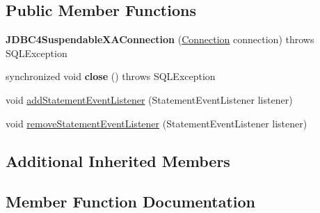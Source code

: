 \subsection*{Public Member Functions}
\begin{DoxyCompactItemize}
\item 
\mbox{\label{classcom_1_1mysql_1_1jdbc_1_1jdbc2_1_1optional_1_1_j_d_b_c4_suspendable_x_a_connection_a0c2994bc20054bb0adfce57478b081b2}} 
{\bfseries J\+D\+B\+C4\+Suspendable\+X\+A\+Connection} (\mbox{\hyperlink{interfacecom_1_1mysql_1_1jdbc_1_1_connection}{Connection}} connection)  throws S\+Q\+L\+Exception 
\item 
\mbox{\label{classcom_1_1mysql_1_1jdbc_1_1jdbc2_1_1optional_1_1_j_d_b_c4_suspendable_x_a_connection_aba26915d57755c6ccba8fffdf791a84a}} 
synchronized void {\bfseries close} ()  throws S\+Q\+L\+Exception 
\item 
void \mbox{\hyperlink{classcom_1_1mysql_1_1jdbc_1_1jdbc2_1_1optional_1_1_j_d_b_c4_suspendable_x_a_connection_a843a8e3024c0dc9be66ddac1e999bb08}{add\+Statement\+Event\+Listener}} (Statement\+Event\+Listener listener)
\item 
void \mbox{\hyperlink{classcom_1_1mysql_1_1jdbc_1_1jdbc2_1_1optional_1_1_j_d_b_c4_suspendable_x_a_connection_af251cdfe978409bb1a5f8004639731f0}{remove\+Statement\+Event\+Listener}} (Statement\+Event\+Listener listener)
\end{DoxyCompactItemize}
\subsection*{Additional Inherited Members}


\subsection{Member Function Documentation}
\mbox{\label{classcom_1_1mysql_1_1jdbc_1_1jdbc2_1_1optional_1_1_j_d_b_c4_suspendable_x_a_connection_a843a8e3024c0dc9be66ddac1e999bb08}} 
